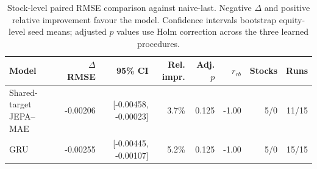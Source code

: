\begin{table}[t]
\centering
\small
\caption{Stock-level paired RMSE comparison against naive-last. Negative $\Delta$ and positive relative improvement favour the model. Confidence intervals bootstrap equity-level seed means; adjusted $p$ values use Holm correction across the three learned procedures.}
\label{tab:paired_rmse_naive}
\begin{tabular}{lrrrrrrr}
\toprule
Model & $\Delta$RMSE & 95\% CI & Rel. impr. & Adj. $p$ & $r_{rb}$ & Stocks & Runs \\
\midrule
Shared-target JEPA--MAE & -0.00206 & [-0.00458, -0.00023] & 3.7\% & 0.125 & -1.00 & 5/0 & 11/15 \\
GRU & -0.00255 & [-0.00445, -0.00107] & 5.2\% & 0.125 & -1.00 & 5/0 & 15/15 \\
\bottomrule
\end{tabular}
\end{table}
